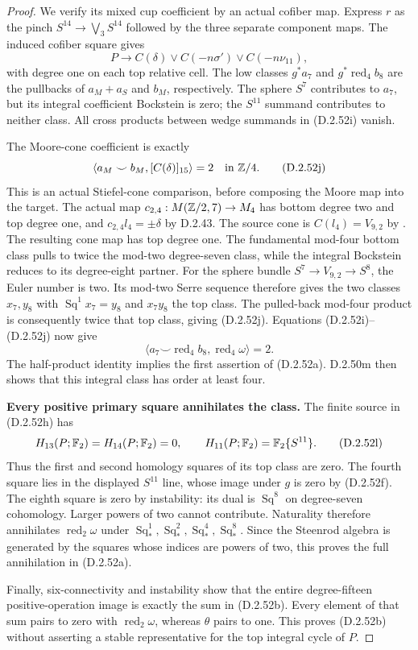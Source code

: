 \begin{proof}
We verify its mixed cup coefficient by an actual cofiber
map. Express $r$ as the pinch $S^{14}\to\bigvee_3S^{14}$
followed by the three separate component maps. The induced
cofiber square gives
\[
 P\longrightarrow
 C(\delta)\vee C(-n\sigma')\vee C(-n\nu_{11}),
 \tag{D.2.52i}
\]
with degree one on each top relative cell. The low classes
$g^*a_7$ and $g^*\operatorname{red}_4b_8$ are the pullbacks
of $a_M+a_S$ and $b_M$, respectively. The sphere $S^7$
contributes to $a_7$, but its integral coefficient Bockstein
is zero; the $S^{11}$ summand contributes to neither class.
All cross products between wedge summands in
\textup{(D.2.52i)} vanish.

The Moore-cone coefficient is exactly
\[
       \langle a_M\smile b_M,[C(\delta)]_{15}\rangle=2
                                      \quad\text{in }\mathbb Z/4.
       \tag{D.2.52j}
\]
This is an actual Stiefel-cone comparison, before composing
the Moore map into the target. The actual
map $c_{2,4}:M(\mathbb Z/2,7)\to M_4$ has bottom degree two
and top degree one, and
$c_{2,4}l_4=\pm\delta$ by D.2.43.
The source cone is $C(l_4)=V_{9,2}$ by
\cite[paragraph before Lemma 2.7 and Lemma 2.8(ii), p.~523]
{EH5MorisugiMukai2000}. The resulting cone map has top degree one.
The fundamental mod-four bottom class pulls to twice the
mod-two degree-seven class, while the integral Bockstein
reduces to its degree-eight partner. For the sphere bundle
$S^7\to V_{9,2}\to S^8$, the Euler number is two.
Its mod-two Serre sequence therefore gives the two classes
$x_7,y_8$ with $\operatorname{Sq}^1x_7=y_8$ and
$x_7y_8$ the top class. The pulled-back mod-four product
is consequently twice that top class, giving
\textup{(D.2.52j)}.
Equations \textup{(D.2.52i)--(D.2.52j)} now give
\[
 \langle a_7\smile\operatorname{red}_4b_8,
                       \operatorname{red}_4\omega\rangle=2.
 \tag{D.2.52k}
\]
The half-product identity implies the first assertion
of \textup{(D.2.52a)}. D.2.50m then shows that this integral
class has order at least four.

\textbf{Every positive primary square annihilates the class.}
The finite source in \textup{(D.2.52h)} has
\[
 H_{13}(P;\mathbb F_2)=H_{14}(P;\mathbb F_2)=0,
 \qquad H_{11}(P;\mathbb F_2)=\mathbb F_2\{S^{11}\}.
 \tag{D.2.52l}
\]
Thus the first and second homology squares of its top class
are zero. The fourth square lies in the displayed
$S^{11}$ line, whose image under $g$ is zero by
\textup{(D.2.52f)}. The eighth square is zero by instability:
its dual is $\operatorname{Sq}^8$ on degree-seven
cohomology. Larger powers of two cannot contribute.
Naturality therefore annihilates
$\operatorname{red}_2\omega$ under
$\operatorname{Sq}_*^1,\operatorname{Sq}_*^2,
\operatorname{Sq}_*^4,\operatorname{Sq}_*^8$.
Since the Steenrod algebra is generated by the squares
whose indices are powers of two, this proves the full
annihilation in \textup{(D.2.52a)}.

Finally, six-connectivity and instability show that the
entire degree-fifteen positive-operation image is exactly
the sum in \textup{(D.2.52b)}. Every element of that sum
pairs to zero with $\operatorname{red}_2\omega$, whereas
$\theta$ pairs to one. This proves
\textup{(D.2.52b)} without asserting a stable representative
for the top integral cycle of $P$.
\end{proof}

